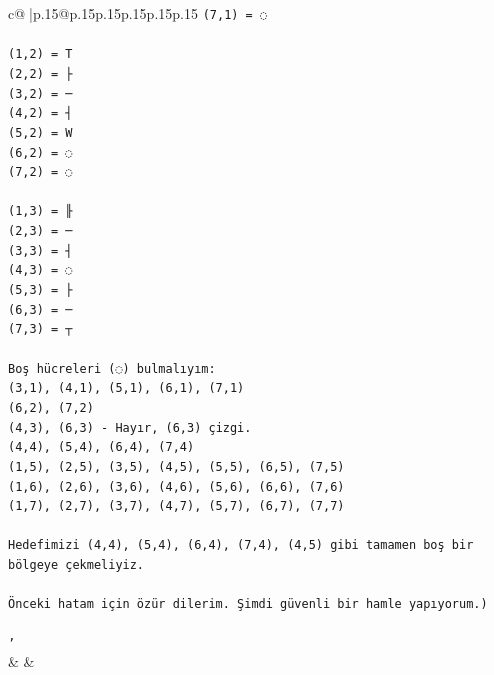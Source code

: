 \documentclass{article}
\begin{document}
{\begin{supertabular}{c@{$\;$}|p{.15\linewidth}@{}p{.15\linewidth}p{.15\linewidth}p{.15\linewidth}p{.15\linewidth}p{.15\linewidth}}
{{{\texttt{(7,1) = ◌} \\
\\ 
\texttt{(1,2) = T} \\
\texttt{(2,2) = ├} \\
\texttt{(3,2) = ─} \\
\texttt{(4,2) = ┤} \\
\texttt{(5,2) = W} \\
\texttt{(6,2) = ◌} \\
\texttt{(7,2) = ◌} \\
\\ 
\texttt{(1,3) = ╟} \\
\texttt{(2,3) = ─} \\
\texttt{(3,3) = ┤} \\
\texttt{(4,3) = ◌} \\
\texttt{(5,3) = ├} \\
\texttt{(6,3) = ─} \\
\texttt{(7,3) = ┬} \\
\\ 
\texttt{Boş hücreleri (◌) bulmalıyım:} \\
\texttt{(3,1), (4,1), (5,1), (6,1), (7,1)} \\
\texttt{(6,2), (7,2)} \\
\texttt{(4,3), (6,3) {-} Hayır, (6,3) çizgi.} \\
\texttt{(4,4), (5,4), (6,4), (7,4)} \\
\texttt{(1,5), (2,5), (3,5), (4,5), (5,5), (6,5), (7,5)} \\
\texttt{(1,6), (2,6), (3,6), (4,6), (5,6), (6,6), (7,6)} \\
\texttt{(1,7), (2,7), (3,7), (4,7), (5,7), (6,7), (7,7)} \\
\\ 
\texttt{Hedefimizi (4,4), (5,4), (6,4), (7,4), (4,5) gibi tamamen boş bir bölgeye çekmeliyiz.} \\
\\ 
\texttt{Önceki hatam için özür dilerim. Şimdi güvenli bir hamle yapıyorum.)} \\
\\ 
\texttt{'} \\
            }
        }
    }
    & & \\ \\


\end{supertabular}}
\end{document}
